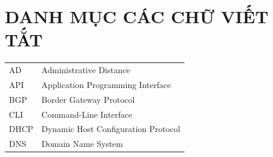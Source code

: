 
\section*{DANH MỤC CÁC CHỮ VIẾT TẮT}
 {}

\begin{tabular}{ l l }

\hspace{1cm} AD & \hspace{3cm} Administrative Distance \\
\hspace{1cm} API & \hspace{3cm} Application Programming Interface \\

\hspace{1cm}  BGP & \hspace{3cm} Border Gateway Protocol\\


\hspace{1cm} CLI & \hspace{3cm}  Command-Line Interface \\
\hspace{1cm} DHCP & \hspace{3cm} Dynamic Host Configuration Protocol \\
\hspace{1cm} DNS  & \hspace{3cm} Domain Name System        \\   


\end{tabular}
